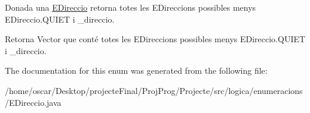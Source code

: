 Donada una \hyperlink{enumlogica_1_1enumeracions_1_1_e_direccio}{E\+Direccio} retorna totes les E\+Direccions possibles menys E\+Direccio.\+Q\+U\+I\+E\+T i \+\_\+direccio. 

\begin{DoxyReturn}{Retorna}
Vector que conté totes les E\+Direccions possibles menys E\+Direccio.\+Q\+U\+I\+E\+T i \+\_\+direccio. 
\end{DoxyReturn}


The documentation for this enum was generated from the following file\+:\begin{DoxyCompactItemize}
\item 
/home/oscar/\+Desktop/projecte\+Final/\+Proj\+Prog/\+Projecte/src/logica/enumeracions/E\+Direccio.\+java\end{DoxyCompactItemize}
